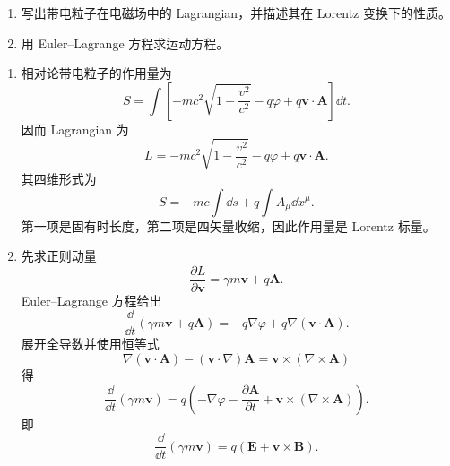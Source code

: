 \begin{question}
\begin{enumerate}
  \item 写出带电粒子在电磁场中的 Lagrangian，并描述其在 Lorentz 变换下的性质。
  \item 用 Euler--Lagrange 方程求运动方程。
\end{enumerate}
\begin{solution}
\begin{enumerate}
  \item 相对论带电粒子的作用量为
  \[
    S=\int\left[-mc^2\sqrt{1-\frac{v^2}{c^2}}-q\varphi+q\mathbf v\cdot\mathbf A\right]\dd{t} .
  \]
  因而 Lagrangian 为
  \[
    \boxed{L=-mc^2\sqrt{1-\frac{v^2}{c^2}}-q\varphi+q\mathbf v\cdot\mathbf A} .
  \]
  其四维形式为
  \[
    S=-mc\int\dd{s}+q\int A_\mu\dd{x^\mu} .
  \]
  第一项是固有时长度，第二项是四矢量收缩，因此作用量是 Lorentz 标量。

  \item 先求正则动量
  \[
    \frac{\partial L}{\partial\mathbf v}=\gamma m\mathbf v+q\mathbf A .
  \]
  Euler--Lagrange 方程给出
  \[
    \frac{\dd{}}{\dd{t}}(\gamma m\mathbf v+q\mathbf A)
    =-q\nabla\varphi+q\nabla(\mathbf v\cdot\mathbf A) .
  \]
  展开全导数并使用恒等式
  \[
    \nabla(\mathbf v\cdot\mathbf A)- (\mathbf v\cdot\nabla)\mathbf A
    =\mathbf v\times(\nabla\times\mathbf A)
  \]
  得
  \[
    \frac{\dd{}}{\dd{t}}(\gamma m\mathbf v)
    =q\left(-\nabla\varphi-\frac{\partial\mathbf A}{\partial t}
    +\mathbf v\times(\nabla\times\mathbf A)\right).
  \]
  即
  \[
    \boxed{\frac{\dd{}}{\dd{t}}(\gamma m\mathbf v)=q(\mathbf E+\mathbf v\times\mathbf B)} .
  \]
\end{enumerate}
\end{solution}
\end{question}

